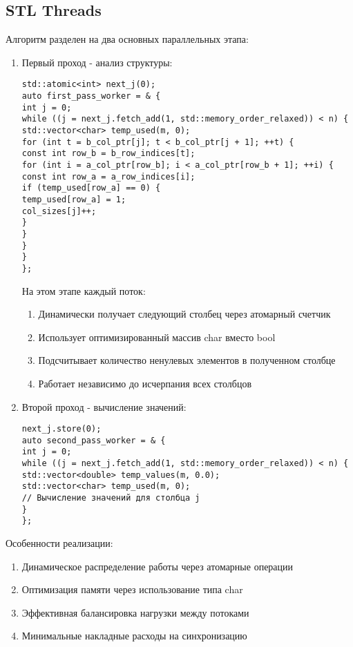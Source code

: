\documentclass[12pt]{article}
\begin{document}
\subsection{STL Threads}
Алгоритм разделен на два основных параллельных этапа:
\begin{enumerate}
\item Первый проход - анализ структуры:
\begin{lstlisting}
std::atomic<int> next_j(0);
auto first_pass_worker = & {
int j = 0;
while ((j = next_j.fetch_add(1, std::memory_order_relaxed)) < n) {
std::vector<char> temp_used(m, 0);
for (int t = b_col_ptr[j]; t < b_col_ptr[j + 1]; ++t) {
const int row_b = b_row_indices[t];
for (int i = a_col_ptr[row_b]; i < a_col_ptr[row_b + 1]; ++i) {
const int row_a = a_row_indices[i];
if (temp_used[row_a] == 0) {
temp_used[row_a] = 1;
col_sizes[j]++;
}
}
}
}
};
\end{lstlisting}
На этом этапе каждый поток:
\begin{enumerate}
\item Динамически получает следующий столбец через атомарный счетчик
\item Использует оптимизированный массив char вместо bool
\item Подсчитывает количество ненулевых элементов в полученном столбце
\item Работает независимо до исчерпания всех столбцов
\end{enumerate}
\item Второй проход - вычисление значений:
\begin{lstlisting}
next_j.store(0);
auto second_pass_worker = & {
int j = 0;
while ((j = next_j.fetch_add(1, std::memory_order_relaxed)) < n) {
std::vector<double> temp_values(m, 0.0);
std::vector<char> temp_used(m, 0);
// Вычисление значений для столбца j
}
};
\end{lstlisting}
\end{enumerate}
Особенности реализации:
\begin{enumerate}
\item Динамическое распределение работы через атомарные операции
\item Оптимизация памяти через использование типа char
\item Эффективная балансировка нагрузки между потоками
\item Минимальные накладные расходы на синхронизацию
\end{enumerate}
\end{document}
